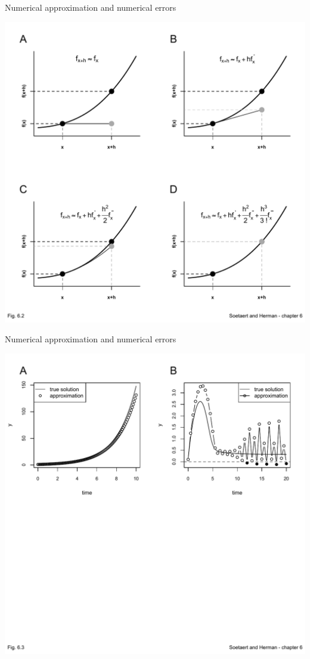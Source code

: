 \documentclass{eecslides}
\begin{document}
	\begin{frame}[fragile]{Numerical approximation and numerical errors}
		\begin{center}
			\includegraphics[height=0.75\textheight]{fig6_2}
		\end{center}
	\end{frame}

	\begin{frame}[fragile]{Numerical approximation and numerical errors}
		\begin{center}
			\includegraphics[height=0.55\textheight]{fig6_3}
		\end{center}
	\end{frame}
\end{document}
